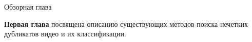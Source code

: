 \documentclass{.local/lib/classes/ndvr-super-article-standalone}
\begin{document}
    \begin{content-item}{Обзорная глава}

        \textbf{Первая глава} посвящена описанию существующих методов 
        поиска нечетких дубликатов видео и их классификации.


    \end{content-item}
\end{document}
